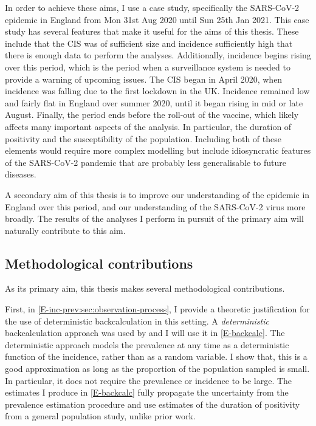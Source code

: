 \documentclass[thesis.tex]{subfiles}
\begin{document}
In order to achieve these aims, I use a case study, specifically the SARS-CoV-2 epidemic in England from Mon 31st Aug 2020 until Sun 25th Jan 2021.
This case study has several features that make it useful for the aims of this thesis.
These include that the CIS was of sufficient size and incidence sufficiently high that there is enough data to perform the analyses.
Additionally, incidence begins rising over this period, which is the period when a surveillance system is needed to provide a warning of upcoming issues.
The CIS began in April 2020, when incidence was falling due to the first lockdown in the UK.
Incidence remained low and fairly flat in England over summer 2020, until it began rising in mid or late August.
Finally, the period ends before the roll-out of the vaccine, which likely affects many important aspects of the analysis.
In particular, the duration of positivity and the susceptibility of the population.
Including both of these elements would require more complex modelling but include idiosyncratic features of the SARS-CoV-2 pandemic that are probably less generalisable to future diseases.

A secondary aim of this thesis is to improve our understanding of the epidemic in England over this period, and our understanding of the SARS-CoV-2 virus more broadly.
The results of the analyses I perform in pursuit of the primary aim will naturally contribute to this aim.

\subsection{Methodological contributions}

As its primary aim, this thesis makes several methodological contributions.

First, in \cref{E-inc-prev:sec:observation-process}, I provide a theoretic justification for the use of deterministic backcalculation in this setting.
A \emph{deterministic} backcalculation approach was used by \textcite{abbottCISincidence} and I will use it in \cref{E-backcalc}.
The deterministic approach models the prevalence at any time as a deterministic function of the incidence, rather than as a random variable.
I show that, this is a good approximation as long as the proportion of the population sampled is small.
In particular, it does not require the prevalence or incidence to be large.
The estimates I produce in \cref{E-backcalc} fully propagate the uncertainty from the prevalence estimation procedure and use estimates of the duration of positivity from a general population study, unlike prior work.
\end{document}
